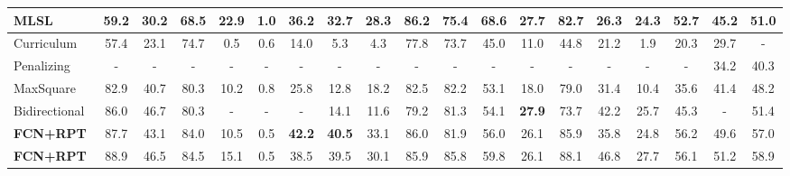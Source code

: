 \documentclass[10pt,twocolumn,letterpaper]{article}
\begin{document}
\begin{table*}[]
\begin{tabular}{l@{~}|@{~}c@{~~}c@{~~}c@{~~}c@{~~}c@{~~}c@{~~}c@{~~}c@{~~}c@{~~}c@{~~}c@{~~}c@{~~}c@{~~}c@{~~}c@{~~}c@{~}|@{~}c@{~~}c@{~}}
   MLSL~\cite{iqbal2019mlsl}                    & 59.2          & 30.2          & 68.5          & \textbf{22.9} & 1.0          & 36.2          & 32.7          & 28.3          & \textbf{86.2} & 75.4          & \textbf{68.6} & 27.7          & 82.7          & 26.3          & 24.3          & 52.7          & 45.2          & 51.0          \\ \hline
   Curriculum~\cite{zhang2017curriculum}        & 57.4          & 23.1          & 74.7          & 0.5           & 0.6          & 14.0          & 5.3           & 4.3           & 77.8          & 73.7          & 45.0          & 11.0          & 44.8          & 21.2          & 1.9           & 20.3          & 29.7          & -             \\
   Penalizing~\cite{zhu2018penalizing}          & -             & -             & -             & -             & -            & -             & -             & -             & -             & -             & -             & -             & -             & -             & -             & -             & 34.2          & 40.3          \\
   MaxSquare~\cite{Chen_2019_ICCV}              & 82.9          & 40.7          & 80.3          & 10.2          & 0.8          & 25.8          & 12.8          & 18.2          & 82.5          & 82.2          & 53.1          & 18.0          & 79.0          & 31.4          & 10.4          & 35.6          & 41.4          & 48.2          \\
   Bidirectional~\cite{li2019bidirectional}     & 86.0          & 46.7          & 80.3          & -             & -            & -             & 14.1          & 11.6          & 79.2          & 81.3          & 54.1          & \textbf{27.9} & 73.7          & 42.2          & 25.7          & 45.3          & -             & 51.4          \\   \hline\hline
   \textbf{FCN+RPT}                                  & 87.7          & 43.1          & 84.0          & 10.5          & 0.5          & \textbf{42.2} & \textbf{40.5} & 33.1          & 86.0          & 81.9          & 56.0          & 26.1          & 85.9          & 35.8          & 24.8          & 56.2          & 49.6          & 57.0        \\
   \textbf{FCN+RPT}                                  & 88.9          & 46.5          & 84.5          & 15.1          & 0.5          & 38.5          & 39.5          & 30.1          & 85.9          & 85.8          & 59.8          & 26.1          & 88.1          & 46.8          & 27.7          & 56.1          & 51.2          & 58.9         \\

\end{tabular}
\end{table*}
\end{document}
